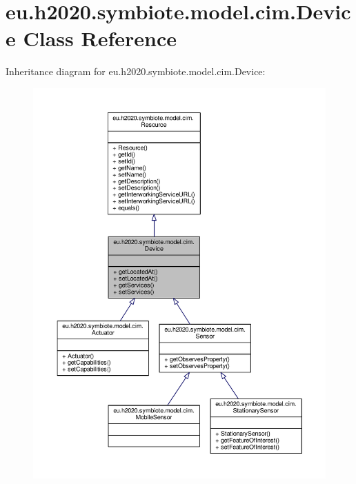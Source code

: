\hypertarget{classeu_1_1h2020_1_1symbiote_1_1model_1_1cim_1_1Device}{}\section{eu.\+h2020.\+symbiote.\+model.\+cim.\+Device Class Reference}
\label{classeu_1_1h2020_1_1symbiote_1_1model_1_1cim_1_1Device}


Inheritance diagram for eu.\+h2020.\+symbiote.\+model.\+cim.\+Device\+:\nopagebreak
\begin{figure}[H]
\begin{center}
\leavevmode
\includegraphics[width=350pt]{classeu_1_1h2020_1_1symbiote_1_1model_1_1cim_1_1Device__inherit__graph}
\end{center}
\end{figure}


